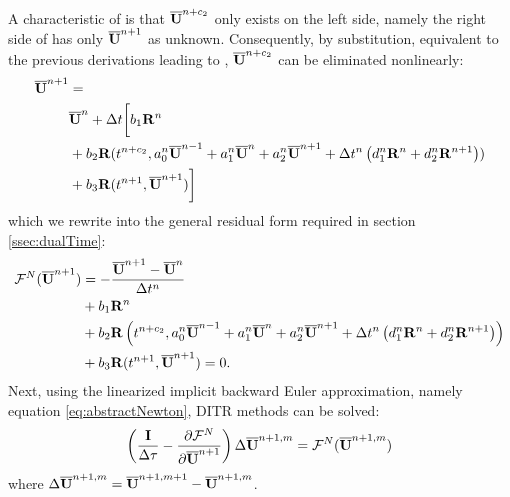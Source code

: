 \documentclass[preprint,12pt]{elsarticle}
\begin{document}
A characteristic of  is that
$\overline{\mathbf{U}}^{n+c_2}$ only exists on the left side, namely the
right side of  has only $\overline{\mathbf{U}}^{n+1}$ as
unknown. Consequently, by substitution, equivalent
to the previous derivations leading to ,
$\overline{\mathbf{U}}^{n+c_2}$ can be eliminated nonlinearly:
\begin{equation}
    \begin{aligned}
        \overline{\mathbf{U}}^{n+1} & =                       \\
                  & \overline{\mathbf{U}}^{n} + \mathrm\Delta t\biggl[
        b_1 \mathbf{R}^n                            \\
                  & +
            b_2 \mathbf{R}(t^{n+c_2},a^n_0\overline{\mathbf{U}}^{n - 1} +
            a^n_1\overline{\mathbf{U}}^{n} +
            a^n_2\overline{\mathbf{U}}^{n + 1}
            +
            \mathrm\Delta t^n
            \left(
            d^n_1\mathbf{R}^{n} +
            d^n_2\mathbf{R}^{n + 1}
        \right))                            \\
                  & +
            b_3 \mathbf{R}(t^{n+1},\overline{\mathbf{U}}^{n+1})
            \biggr]
        \label{eq:nestedDITR}
    \end{aligned}
\end{equation}
which we rewrite into the general residual form required in section \ref{ssec:dualTime}:
\begin{equation}
    \begin{aligned}
        \mathcal{F}^N(\overline{\mathbf{U}}^{n+1}) & = -\frac{\overline{\mathbf{U}}^{n+1} - \overline{\mathbf{U}}^{n}}{\mathrm\Delta t^n} \\
                       & +
        b_1 \mathbf{R}^n                                                 \\
                       & +
        b_2 \mathbf{R}\left(t^{n+c_2},a^n_0\overline{\mathbf{U}}^{n - 1} +
        a^n_1\overline{\mathbf{U}}^{n} +
        a^n_2\overline{\mathbf{U}}^{n + 1}
        +
        \mathrm\Delta t^n
        \left(
        d^n_1\mathbf{R}^{n} +
        d^n_2\mathbf{R}^{n + 1}
        \right)\right)                                           \\
                       & +
        b_3 \mathbf{R}(t^{n+1},\overline{\mathbf{U}}^{n+1}) = 0.
        \label{eq:nestedDITR_F}
    \end{aligned}
\end{equation}
Next, using the linearized implicit backward Euler approximation,
namely equation \eqref{eq:abstractNewton}, DITR methods can be solved:
\begin{equation}
    \left(\frac{\eye}{\inc\tau} -
    \partialderivative{\FF^N}{\uu^{n+1}}  \right)
    \inc\uu^{n+1,m} = \FF^N(\uu^{n+1,m})
    \label{eq:abstractNewtonNested}
\end{equation}
where $\mathrm\Delta\overline{\mathbf{U}}^{n+1,m}=\overline{\mathbf{U}}^{n+1,m+1}-\overline{\mathbf{U}}^{n+1,m}$.
\end{document}
